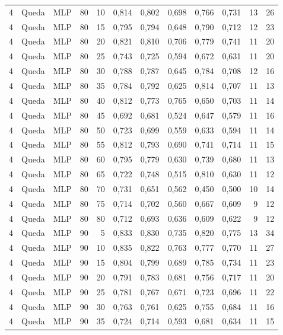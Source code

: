 \begin{longtable}{ccclrrrrrrrr}
4 & Queda & MLP & 80 & 10 & 0,814 & 0,802 & 0,698 & 0,766 & 0,731 & 13 & 26 \\
4 & Queda & MLP & 80 & 15 & 0,795 & 0,794 & 0,648 & 0,790 & 0,712 & 12 & 23 \\
4 & Queda & MLP & 80 & 20 & 0,821 & 0,810 & 0,706 & 0,779 & 0,741 & 11 & 20 \\
4 & Queda & MLP & 80 & 25 & 0,743 & 0,725 & 0,594 & 0,672 & 0,631 & 11 & 20 \\
4 & Queda & MLP & 80 & 30 & 0,788 & 0,787 & 0,645 & 0,784 & 0,708 & 12 & 16 \\
4 & Queda & MLP & 80 & 35 & 0,784 & 0,792 & 0,625 & 0,814 & 0,707 & 11 & 13 \\
4 & Queda & MLP & 80 & 40 & 0,812 & 0,773 & 0,765 & 0,650 & 0,703 & 11 & 14 \\
4 & Queda & MLP & 80 & 45 & 0,692 & 0,681 & 0,524 & 0,647 & 0,579 & 11 & 16 \\
4 & Queda & MLP & 80 & 50 & 0,723 & 0,699 & 0,559 & 0,633 & 0,594 & 11 & 14 \\
4 & Queda & MLP & 80 & 55 & 0,812 & 0,793 & 0,690 & 0,741 & 0,714 & 11 & 15 \\
4 & Queda & MLP & 80 & 60 & 0,795 & 0,779 & 0,630 & 0,739 & 0,680 & 11 & 13 \\
4 & Queda & MLP & 80 & 65 & 0,722 & 0,748 & 0,515 & 0,810 & 0,630 & 11 & 12 \\
4 & Queda & MLP & 80 & 70 & 0,731 & 0,651 & 0,562 & 0,450 & 0,500 & 10 & 14 \\
4 & Queda & MLP & 80 & 75 & 0,714 & 0,702 & 0,560 & 0,667 & 0,609 & 9 & 12 \\
4 & Queda & MLP & 80 & 80 & 0,712 & 0,693 & 0,636 & 0,609 & 0,622 & 9 & 12 \\
4 & Queda & MLP & 90 & 5 & 0,833 & 0,830 & 0,735 & 0,820 & 0,775 & 13 & 34 \\
4 & Queda & MLP & 90 & 10 & 0,835 & 0,822 & 0,763 & 0,777 & 0,770 & 11 & 27 \\
4 & Queda & MLP & 90 & 15 & 0,804 & 0,799 & 0,689 & 0,785 & 0,734 & 11 & 23 \\
4 & Queda & MLP & 90 & 20 & 0,791 & 0,783 & 0,681 & 0,756 & 0,717 & 11 & 20 \\
4 & Queda & MLP & 90 & 25 & 0,781 & 0,767 & 0,671 & 0,723 & 0,696 & 11 & 22 \\
4 & Queda & MLP & 90 & 30 & 0,763 & 0,761 & 0,625 & 0,755 & 0,684 & 11 & 16 \\
4 & Queda & MLP & 90 & 35 & 0,724 & 0,714 & 0,593 & 0,681 & 0,634 & 11 & 15 \\

\end{longtable}
